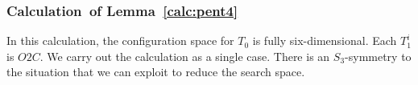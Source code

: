 \subsubsection{Calculation~of Lemma~\ref{calc:pent4}} 
In this calculation, the configuration space for $T_0$ is fully
six-dimensional.  Each $T_1^i$ is $O2C$.  We carry out the calculation
as a single case.  There is an $S_3$-symmetry to the situation that we
can exploit to reduce the search space.
